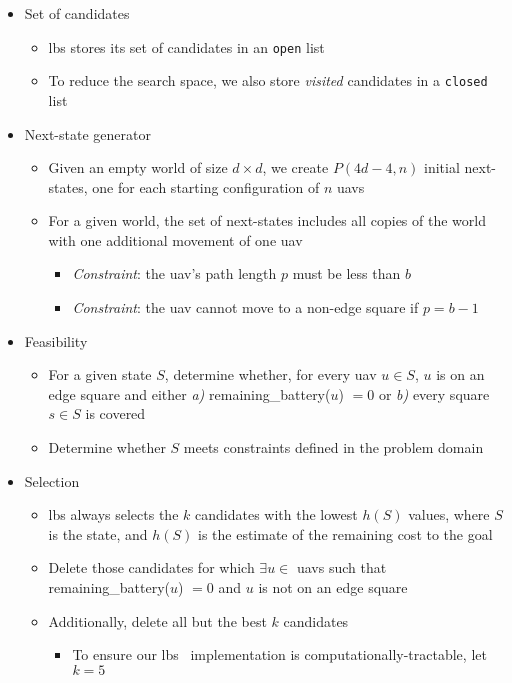 \documentclass[../main.tex]{subfiles}
\begin{document}
\begin{itemize}
    \item Set of candidates
    \begin{itemize}
        \item \ac{lbs} stores its set of candidates in an \texttt{open} list
        \item To reduce the search space, we also store \textit{visited} candidates in a \texttt{closed} list
    \end{itemize}
    
    \item Next-state generator
    \begin{itemize}
        \item Given an empty world of size $d\times d$, we create $P(4d-4,n)$ initial next-states, one for each starting configuration of $n$ \acp{uav}
        \item For a given world, the set of next-states includes all copies of the world with one additional movement of one \ac{uav}
        \begin{itemize}
            \item \textit{Constraint}: the \ac{uav}'s path length $p$ must be less than $b$
            \item \textit{Constraint}: the \ac{uav} cannot move to a non-edge square if $p=b-1$
        \end{itemize}
    
    \end{itemize}
    
    \item Feasibility
    \begin{itemize}
        \item For a given state $S$, determine whether, for every \ac{uav} $u\in S$, $u$ is on an edge square and either \textit{a)} remaining\_battery($u$) $=0$ or \textit{b)} every square $s\in S$ is covered
        \item Determine whether $S$ meets constraints defined in the problem domain
    \end{itemize}

    \item Selection
    \begin{itemize}
        \item \ac{lbs} always selects the $k$ candidates with the lowest $h(S)$ values, where $S$ is the state, and $h(S)$ is the estimate of the remaining cost to the goal
        \item Delete those candidates for which $\exists u\in$ \acp{uav} such that remaining\_battery($u$) $=0$ and $u$ is not on an edge square
        \item Additionally, delete all but the best $k$ candidates
        \begin{itemize}
            \item To ensure our \ac{lbs} \probs\ implementation is computationally-tractable, let $k=5$ \cite{wikipedia:computational_complexity_theory}
        \end{itemize} 
    \end{itemize}


\end{itemize}
\end{document}
